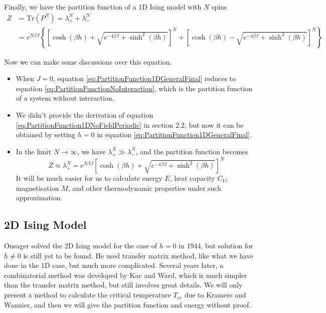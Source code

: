 \documentclass[11pt]{article}
\begin{document}
	Finally, we have the partition function of a 1D Ising model with $N$ spins
	\begin{equation} \label{eq:PartitionFunction1DGeneralFinal}
		\begin{aligned}
			Z &= \mathrm{Tr}(P^N) = \lambda_+^N + \lambda_-^N \\
			&= e^{N \beta J} \left\{\left[\cosh(\beta h) + \sqrt{e^{-4\beta J}+\sinh^2(\beta h)}\right]^N
			 + \left[\cosh(\beta h) - \sqrt{e^{-4\beta J}+\sinh^2(\beta h)}\right]^N\right\}
		\end{aligned}
	\end{equation}

	Now we can make some discussions over this equation.
	\begin{itemize}
		\item When $J = 0$, equation \eqref{eq:PartitionFunction1DGeneralFinal} reduces to equation \eqref{eq:PartitionFunctionNoInteraction},
			which is the partition function of a system without interaction.
		\item We didn't provide the derivation of equation \eqref{eq:PartitionFunction1DNoFieldPeriodic} in section 2.2,
			but now it can be obtained by setting $h = 0$ in equation \eqref{eq:PartitionFunction1DGeneralFinal}.
		\item In the limit $N \to \infty$, we have $\lambda_+^N \gg \lambda_-^N$, and the partition function becomes
			\begin{equation} \label{eq:PartitionFunction1DGeneralLimit}
				Z \approx \lambda_+^N = e^{N \beta J} \left[\cosh(\beta h) + \sqrt{e^{-4\beta J}+\sinh^2(\beta h)}\right]^N
			\end{equation}
		It will be much easier for us to calculate energy $E$, heat capacity $C_V$, magnetisation $M$, 
		and other thermodynamic properties under such approximation.
	\end{itemize}

	\subsection{2D Ising Model}
	
	Onsager solved the 2D Ising model for the case of $h = 0$ in 1944\cite{onsager_solution},
	but solution for $h \neq 0$ is still yet to be found.
	He used transfer matrix method, like what we have done in the 1D case, but much more complicated.
	Several years later, a combinatorial method was developed by Kac and Ward\cite{KacWard1952}, 
	which is much simpler than the transfer matrix method, but still involves great details.
	We will only present a method to calculate the critical temperature $T_{cr}$ due to Kramers and Wannier\cite{KramersWannier1941},
	and then we will give the partition function and energy without proof.
\end{document}
